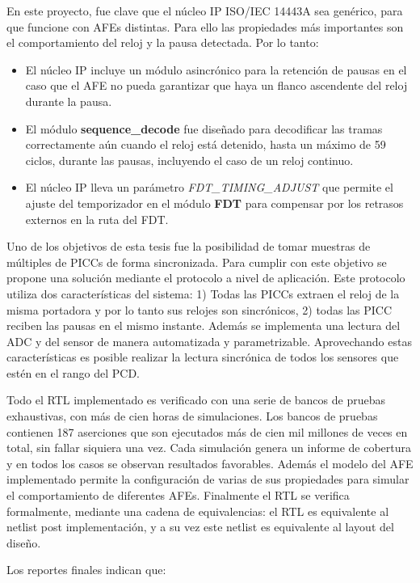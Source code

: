 \documentclass[a4paper, twoside, 11pt]{report}
\begin{document}
En este proyecto, fue clave que el núcleo IP ISO/IEC 14443A sea genérico, para que funcione con AFEs distintas. Para ello las propiedades más importantes son el comportamiento del reloj y la pausa detectada. Por lo tanto:

\begin{itemize}
  \item El núcleo IP incluye un módulo asincrónico para la retención de pausas en el caso que el AFE no pueda garantizar que haya un flanco ascendente del reloj durante la pausa.
  \item El módulo \textbf{sequence\_decode} fue diseñado para decodificar las tramas correctamente aún cuando el reloj está detenido, hasta un máximo de 59 ciclos, durante las pausas, incluyendo el caso de un reloj continuo.
  \item El núcleo IP lleva un parámetro \textit{FDT\_TIMING\_ADJUST} que permite el ajuste del temporizador en el módulo \textbf{FDT} para compensar por los retrasos externos en la ruta del FDT.
\end{itemize}

Uno de los objetivos de esta tesis fue la posibilidad de tomar muestras de múltiples de PICCs de forma sincronizada. Para cumplir con este objetivo se propone una solución mediante el protocolo a nivel de aplicación. Este protocolo utiliza dos características del sistema: 1) Todas las PICCs extraen el reloj de la misma portadora y por lo tanto sus relojes son sincrónicos, 2) todas las PICC reciben las pausas en el mismo instante. Además se implementa una lectura del ADC y del sensor de manera automatizada y parametrizable. Aprovechando estas características es posible realizar la lectura sincrónica de todos los sensores que estén en el rango del PCD.

Todo el RTL implementado es verificado con una serie de bancos de pruebas exhaustivas, con más de cien horas de simulaciones. Los bancos de pruebas contienen 187 aserciones que son ejecutados más de cien mil millones de veces en total, sin fallar siquiera una vez. Cada simulación genera un informe de cobertura y en todos los casos se observan resultados favorables. Además el modelo del AFE implementado permite la configuración de varias de sus propiedades para simular el comportamiento de diferentes AFEs. Finalmente el RTL se verifica formalmente, mediante una cadena de equivalencias: el RTL es equivalente al netlist post implementación, y a su vez este netlist es equivalente al layout del diseño.

Los reportes finales indican que:
\end{document}
